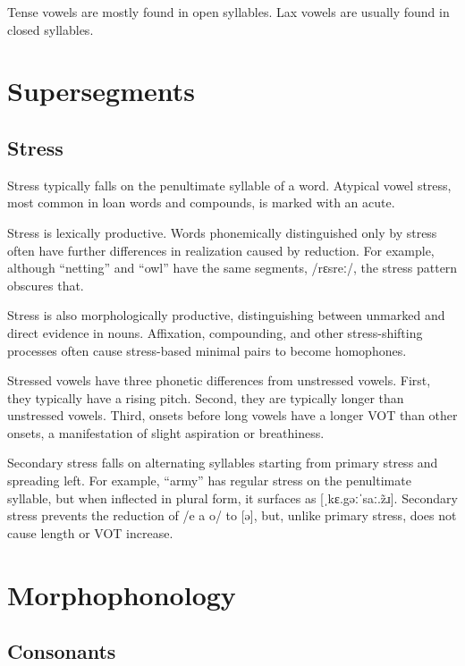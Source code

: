 Tense vowels are mostly found in open syllables. Lax vowels are usually found in closed syllables.

\setchapterpreamble[u]{\margintoc}
\chapter{Supersegments}
\section{Stress}
 Stress typically falls on the penultimate syllable of a word. Atypical vowel stress, most common in loan words and compounds, is marked with an acute. 

Stress is lexically productive. Words phonemically distinguished only by stress often have further differences in realization caused by reduction. For example, although  “netting” and  “owl” have the same segments, /rɛsreː/, the stress pattern obscures that.

Stress is also morphologically productive, distinguishing between unmarked and direct evidence in nouns. Affixation, compounding, and other stress-shifting processes often cause stress-based minimal pairs to become homophones.

Stressed vowels have three phonetic differences from unstressed vowels. First, they typically have a rising pitch. Second, they are typically longer than unstressed vowels. Third, onsets before long vowels have a longer VOT than other onsets, a manifestation of slight aspiration or breathiness.

Secondary stress falls on alternating syllables starting from primary stress and spreading left. For example,  “army” has regular stress on the penultimate syllable, but when inflected in plural form, it surfaces as  [ˌkɛ.gəːˈsaː.z̃ɹ]. Secondary stress prevents the reduction of /e a o/ to [ə], but, unlike primary stress, does not cause length or VOT increase.

\setchapterpreamble[u]{\margintoc}
\chapter{Morphophonology}
\section{Consonants} 
